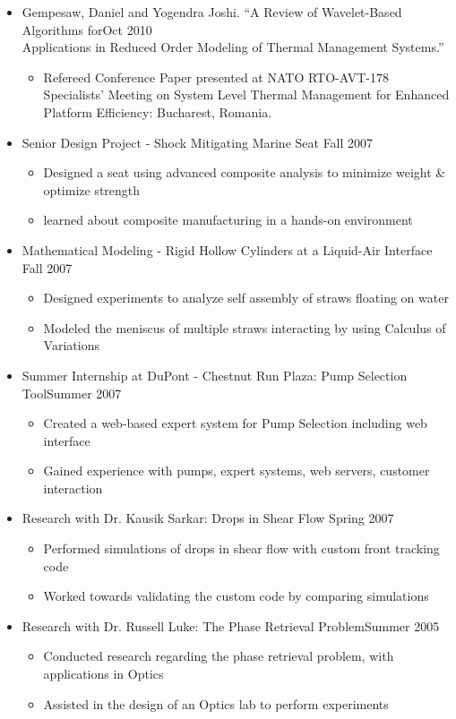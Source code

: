 \documentclass[10pt]{article}
\newenvironment{myitem}{
\begin{itemize}
  \setlength{\itemsep}{1pt}
  \setlength{\parskip}{0pt}
  \setlength{\parsep}{0pt}
}{\end{itemize}}
\begin{document}
\begin{myitem}
  \item Gempesaw, Daniel and Yogendra Joshi. ``A Review of Wavelet-Based Algorithms for\hfill Oct 2010\\ 
Applications in Reduced Order Modeling of Thermal Management Systems.''
  \begin{myitem}
    \item Refereed Conference Paper presented at NATO RTO-AVT-178 Specialists' Meeting on System Level Thermal Management for Enhanced Platform Efficiency: Bucharest, Romania. 
  \end{myitem}%

  \item Senior Design Project - Shock Mitigating Marine Seat \hfill Fall 2007
  \begin{myitem}
    \item Designed a seat using advanced composite analysis to minimize weight \& optimize strength
    \item learned about composite manufacturing in a hands-on environment
  \end{myitem}
%
\item Mathematical Modeling - Rigid Hollow Cylinders at a Liquid-Air Interface \hfill Fall 2007
\begin{myitem}
su  \item Designed experiments to analyze self assembly of straws floating on water
  \item Modeled the meniscus of multiple straws interacting by using Calculus of Variations
\end{myitem}
%
\item Summer Internship at DuPont - Chestnut Run Plaza: Pump Selection Tool\hfill Summer 2007
 \begin{myitem}
  \item Created a web-based expert system for Pump Selection including web interface
  \item Gained experience with pumps, expert systems, web servers, customer interaction
 \end{myitem}
%
\item Research with Dr. Kausik Sarkar: Drops in Shear Flow \hfill Spring 2007
 \begin{myitem}
  \item Performed simulations of drops in shear flow with custom front tracking code
  \item Worked towards validating the custom code by comparing simulations
 \end{myitem}
%
\item Research with Dr. Russell Luke: The Phase Retrieval Problem\hfill Summer 2005
 \begin{myitem}
  \item Conducted research regarding the phase retrieval problem, with applications in Optics
  \item Assisted in the design of an Optics lab to perform experiments
 \end{myitem}
\end{myitem}
%
\vspace{-.55cm}
\end{document}
